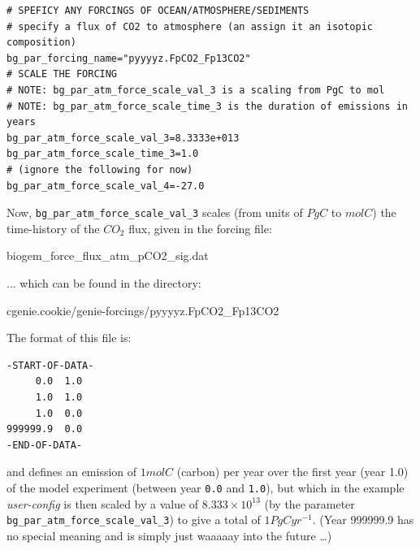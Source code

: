 \vspace{-2mm}\footnotesize\begin{verbatim}
# SPEFICY ANY FORCINGS OF OCEAN/ATMOSPHERE/SEDIMENTS
# specify a flux of CO2 to atmosphere (an assign it an isotopic composition)
bg_par_forcing_name="pyyyyz.FpCO2_Fp13CO2"
# SCALE THE FORCING 
# NOTE: bg_par_atm_force_scale_val_3 is a scaling from PgC to mol
# NOTE: bg_par_atm_force_scale_time_3 is the duration of emissions in years
bg_par_atm_force_scale_val_3=8.3333e+013
bg_par_atm_force_scale_time_3=1.0
# (ignore the following for now)
bg_par_atm_force_scale_val_4=-27.0
\end{verbatim}\normalsize\vspace{-2mm}

Now, \texttt{\small bg\_par\_atm\_force\_scale\_val\_3} scales (from units of $PgC$ to $molC$) the time-history of the \(CO_{2}\) flux, given in the forcing file:

\vspace{2pt}
\noindent \textsf{\footnotesize biogem\_force\_flux\_atm\_pCO2\_sig.dat}
\vspace{2pt}

\noindent ... which can be found in the directory:

\vspace{2pt}
\noindent \textsf{\footnotesize cgenie.cookie/genie-forcings/pyyyyz.FpCO2\_Fp13CO2}
\vspace{2pt}

\vspace{2pt}
\noindent The format of this file is:
\vspace{-2pt}\footnotesize\begin{verbatim}
-START-OF-DATA-
     0.0  1.0
     1.0  1.0
     1.0  0.0
999999.9  0.0
-END-OF-DATA-
\end{verbatim}\normalsize\vspace{-2pt}

\noindent and defines an emission of \(1 mol C\) (carbon) per year over the first year (year 1.0) of the model experiment (between year \texttt{0.0} and \texttt{1.0}), but which in the example \textit{user-config} is then scaled by a value of \(8.333\times10^{13}\) (by the parameter \texttt{bg\_par\_atm\_force\_scale\_val\_3}) to give a total of \(1 PgC yr^{-1}\). (Year 999999.9 has no special meaning and is simply just waaaaay into the future …)

\vspace{1mm}

